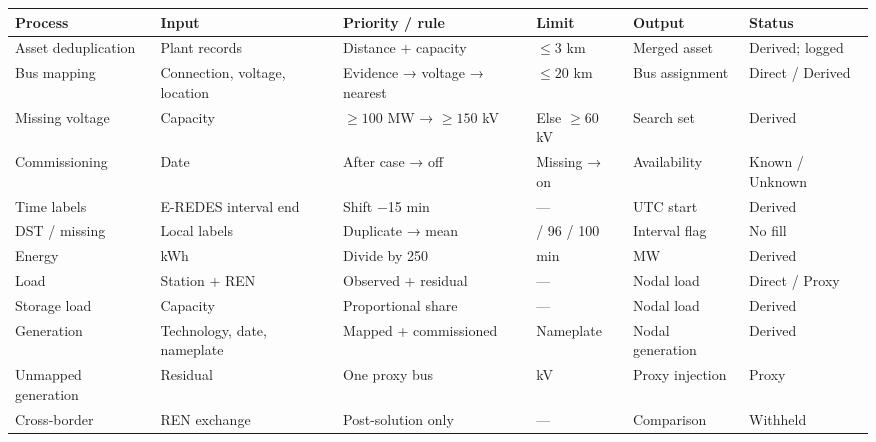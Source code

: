 \documentclass[
  10pt]{article}
\begin{document}
\begin{longtable}[]{@{}
  >{\raggedright\arraybackslash}p{}
  >{\raggedright\arraybackslash}p{}
  >{\raggedright\arraybackslash}p{}
  >{\raggedright\arraybackslash}p{}
  >{\raggedright\arraybackslash}p{}
  >{\raggedright\arraybackslash}p{}@{}}
\toprule\noalign{}
\begin{minipage}[b]{\linewidth}\raggedright
Process
\end{minipage} & \begin{minipage}[b]{\linewidth}\raggedright
Input
\end{minipage} & \begin{minipage}[b]{\linewidth}\raggedright
Priority / rule
\end{minipage} & \begin{minipage}[b]{\linewidth}\raggedright
Limit
\end{minipage} & \begin{minipage}[b]{\linewidth}\raggedright
Output
\end{minipage} & \begin{minipage}[b]{\linewidth}\raggedright
Status
\end{minipage} \\
\midrule\noalign{}
\endhead
\bottomrule\noalign{}
\endlastfoot
Asset deduplication & Plant records & Distance + capacity & \(\leq 3\)
km & Merged asset & Derived; logged \\
Bus mapping & Connection, voltage, location & Evidence → voltage →
nearest & \(\leq 20\) km & Bus assignment & Direct / Derived \\
Missing voltage & Capacity & \(\geq 100\) MW → \(\geq 150\) kV & Else
\(\geq 60\) kV & Search set & Derived \\
Commissioning & Date & After case → off & Missing → on & Availability &
Known / Unknown \\
Time labels & E-REDES interval end & Shift −15 min & --- & UTC start &
Derived \\
DST / missing & Local labels & Duplicate → mean & 92 / 96 / 100 &
Interval flag & No fill \\
Energy & kWh & Divide by 250 & 15 min & MW & Derived \\
Load & Station + REN & Observed + residual & --- & Nodal load & Direct /
Proxy \\
Storage load & Capacity & Proportional share & --- & Nodal load &
Derived \\
Generation & Technology, date, nameplate & Mapped + commissioned &
Nameplate & Nodal generation & Derived \\
Unmapped generation & Residual & One proxy bus & 400 kV & Proxy
injection & Proxy \\
Cross-border & REN exchange & Post-solution only & --- & Comparison &
Withheld \\
\end{longtable}
\end{document}
